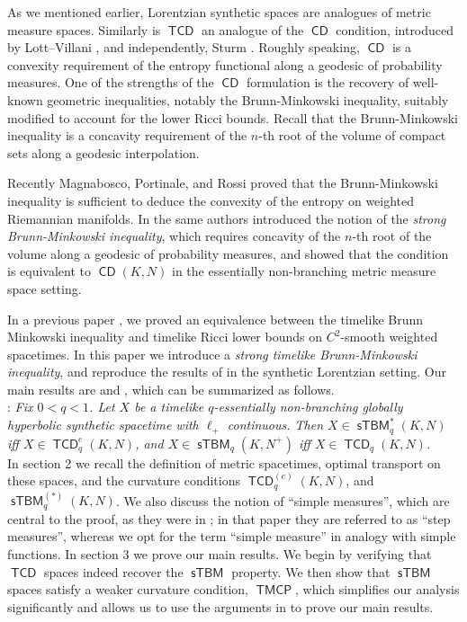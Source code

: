 \documentclass{article}
\DeclareMathOperator{\CD}{\mathsf{CD}}
\DeclareMathOperator{\TCD}{\mathsf{TCD}}
\DeclareMathOperator{\sTBM}{\mathsf{sTBM}}
\DeclareMathOperator{\TMCP}{\mathsf{TMCP}}
\theoremstyle{definition}
\begin{document}
As we mentioned earlier, Lorentzian synthetic spaces are analogues of metric measure spaces. Similarly is $\TCD$ an analogue of the $\CD$ condition, introduced by Lott--Villani \cite{LV}, and independently, Sturm \cite{SturmI,SturmII}. Roughly speaking, $\CD$ is a convexity requirement of the entropy functional along a geodesic of probability measures. One of the strengths of the $\CD$ formulation is the recovery of well-known geometric inequalities, notably the Brunn-Minkowski inequality, suitably modified to account for the lower Ricci bounds. Recall that the Brunn-Minkowski inequality is a concavity requirement of the $n$-th root of the volume of compact sets along a geodesic interpolation. 

Recently Magnabosco, Portinale, and Rossi \cite{MPRI} proved that the Brunn-Minkowski inequality is sufficient to deduce the convexity of the entropy on weighted Riemannian manifolds. In \cite{MPRII} the same authors introduced the notion of the {\it strong Brunn-Minkowski inequality}, which requires concavity of the $n$-th root of the volume along a geodesic of probability measures, and showed that the condition is equivalent to $\CD(K,N)$ in the essentially non-branching metric measure space setting. 

In a previous paper \cite{smoothTBMtoTCD}, we proved an equivalence between the timelike Brunn Minkowski inequality and timelike Ricci lower bounds on $C^2$-smooth weighted spacetimes. In this paper we introduce a {\it strong timelike Brunn-Minkowski inequality}, and reproduce the results of \cite{MPRII} in the synthetic Lorentzian setting. Our main results are  and , which can be summarized as follows. \\


: {\it Fix $0<q<1$. Let $X$ be a timelike $q$-essentially non-branching globally hyperbolic synthetic spacetime with $\ell_+$ continuous. Then $X\in \sTBM_q^*(K,N)$ iff $X\in \TCD_q^e(K,N)$, and $X\in \sTBM_q(K,N^+)$ iff $X\in \TCD_q(K,N)$.}\\


In section 2 we recall the definition of metric spacetimes, optimal transport on these spaces, and the curvature conditions $\TCD_q^{(e)}(K,N)$, and $\sTBM_q^{(*)}(K,N)$. We also discuss the notion of ``simple measures'', which are central to the proof, as they were in \cite{MPRII}; in that paper they are referred to as ``step measures'', whereas we opt for the term ``simple measure'' in analogy with simple functions. In section 3 we prove our main results. We begin by verifying that $\TCD$ spaces indeed recover the $\sTBM$ property. We then show that $\sTBM$ spaces satisfy a weaker curvature condition, $\TMCP$, which simplifies our analysis significantly and allows us to use the arguments in \cite{MPRII} to prove our main results. 
\end{document}
